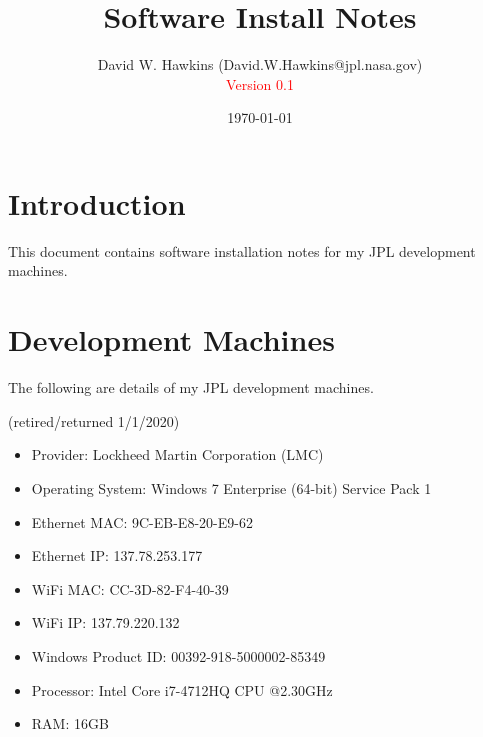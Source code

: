 \documentclass[10pt,twoside]{article}
\begin{document}
\title{Software Install Notes}
\author{David W. Hawkins (David.W.Hawkins@jpl.nasa.gov)\\\textcolor{red}{Version 0.1}}
\date{\today}

\maketitle

\tableofcontents

\pagestyle{fancy}

\cleardoublepage

%
\section{Introduction}

This document contains software installation notes for my JPL development
machines.


\clearpage
\section{Development Machines}

The following are details of my JPL development machines.

\vskip5mm
 (retired/returned 1/1/2020)
\begin{itemize}
\item Provider: Lockheed Martin Corporation (LMC)
\item Operating System: Windows 7 Enterprise (64-bit) Service Pack 1
\item Ethernet MAC: 9C-EB-E8-20-E9-62
\item Ethernet IP: 137.78.253.177
\item WiFi MAC: CC-3D-82-F4-40-39
\item WiFi IP: 137.79.220.132
\item Windows Product ID: 00392-918-5000002-85349
\item Processor: Intel Core i7-4712HQ CPU @2.30GHz
\item RAM: 16GB
\end{itemize}
\end{document}
